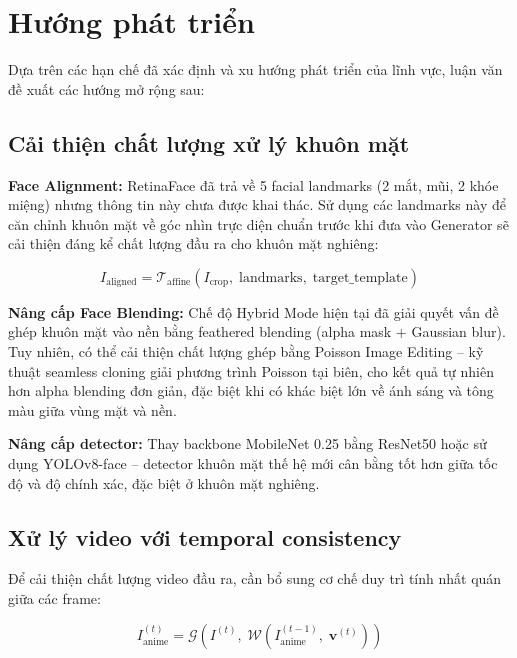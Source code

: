 \section{Hướng phát triển}
\label{sec:future_work}

Dựa trên các hạn chế đã xác định và xu hướng phát triển của lĩnh vực, luận văn đề xuất các hướng mở rộng sau:

\subsection{Cải thiện chất lượng xử lý khuôn mặt}
\label{subsec:future_face}

\textbf{Face Alignment:} RetinaFace đã trả về 5 facial landmarks (2 mắt, mũi, 2 khóe miệng) nhưng thông tin này chưa được khai thác. Sử dụng các landmarks này để căn chỉnh khuôn mặt về góc nhìn trực diện chuẩn trước khi đưa vào Generator sẽ cải thiện đáng kể chất lượng đầu ra cho khuôn mặt nghiêng:

\begin{equation}
\label{eq:face_align}
I_{\text{aligned}} = \mathcal{T}_{\text{affine}}\!\left(I_{\text{crop}},\; \text{landmarks},\; \text{target\_template}\right)
\end{equation}

\textbf{Nâng cấp Face Blending:} Chế độ Hybrid Mode hiện tại đã giải quyết vấn đề ghép khuôn mặt vào nền bằng feathered blending (alpha mask + Gaussian blur). Tuy nhiên, có thể cải thiện chất lượng ghép bằng Poisson Image Editing \cite{Perez2003Poisson} -- kỹ thuật seamless cloning giải phương trình Poisson tại biên, cho kết quả tự nhiên hơn alpha blending đơn giản, đặc biệt khi có khác biệt lớn về ánh sáng và tông màu giữa vùng mặt và nền.

\textbf{Nâng cấp detector:} Thay backbone MobileNet 0.25 bằng ResNet50 hoặc sử dụng YOLOv8-face \cite{Jocher2023YOLOv8} -- detector khuôn mặt thế hệ mới cân bằng tốt hơn giữa tốc độ và độ chính xác, đặc biệt ở khuôn mặt nghiêng.

\subsection{Xử lý video với temporal consistency}
\label{subsec:future_video}

Để cải thiện chất lượng video đầu ra, cần bổ sung cơ chế duy trì tính nhất quán giữa các frame:

\begin{equation}
\label{eq:temporal}
I_{\text{anime}}^{(t)} = \mathcal{G}\!\left(I^{(t)},\; \mathcal{W}\!\left(I_{\text{anime}}^{(t-1)},\; \mathbf{v}^{(t)}\right)\right)
\end{equation}

